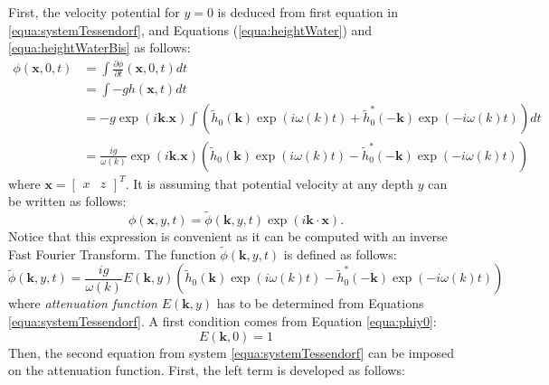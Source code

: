 \documentclass[11pt]{article}
\begin{document}
First, the velocity potential for $y=0$ is deduced from first equation in \ref{equa:systemTessendorf}, and Equations (\ref{equa:heightWater}) and \ref{equa:heightWaterBis} as follows:
\begin{align}
	\phi(\mathbf{x},0,t)
	 & = \int \frac{\partial \phi}{\partial t}(\mathbf{x},0,t)dt \nonumber                                                                                                             \\
	 & =\int-gh(\mathbf{x},t)dt \nonumber                                                                                                                                              \\
	 & = -g\exp(i\mathbf{k}.\mathbf{\mathbf{x}})\int\left(\tilde{h}_0(\mathbf{k})\exp(i\omega(k)t)+\tilde{h}_0^*(-\mathbf{k})\exp(-i\omega(k)t)\right)dt \nonumber                     \\
	 & = \frac{ig}{\omega(k)}\exp(i\mathbf{k}.\mathbf{\mathbf{x}})\left(\tilde{h}_0(\mathbf{k})\exp(i\omega(k)t)-\tilde{h}_0^*(-\mathbf{k})\exp(-i\omega(k)t)\right)\label{equa:phiy0}
\end{align}
where $\mathbf{x}=\left[\begin{array}{cc}x&z\end{array}\right]^T$.
It is assuming that potential velocity at any depth $y$ can be written as follows:
\begin{equation}
	\phi(\mathbf{x},y,t) = \tilde{\phi}(\mathbf{k}, y, t)\exp(i \mathbf{k}\cdot \mathbf{x}).
\end{equation}
Notice that this expression is convenient as it can be computed with an inverse Fast Fourier Transform.
The function $\tilde{\phi}(\mathbf{k}, y, t)$ is defined as follows:
\begin{equation}
	\tilde{\phi}(\mathbf{k}, y, t)=\frac{ig}{\omega(k)} E(\mathbf{k},y) \left(\tilde{h}_0(\mathbf{k})\exp(i\omega(k)t)-\tilde{h}_0^*(-\mathbf{k})\exp(-i\omega(k)t)\right)
\end{equation}
where \textit{attenuation function} $E(\mathbf{k},y)$ has to be determined from Equations \ref{equa:systemTessendorf}.
A first condition comes from Equation \ref{equa:phiy0}:
\begin{equation}
	E(\mathbf{k}, 0)=1 \label{equa:initialE}
\end{equation}
Then, the second equation from system \ref{equa:systemTessendorf} can be imposed on the attenuation function.
First, the left term is developed as follows:
\end{document}
